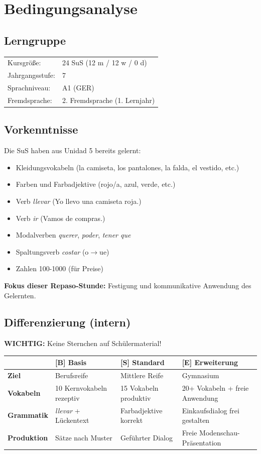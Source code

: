 \documentclass[11pt,a4paper]{article}
\newcommand{\jahrgangsstufe}{7}
\newcommand{\lerngruppengroesse}{24}
\newcommand{\maennlich}{12}
\newcommand{\weiblich}{12}
\newcommand{\divers}{0}
\newcommand{\gerniveau}{A1}
\begin{document}
\section{Bedingungsanalyse}

\subsection{Lerngruppe}
\begin{tabular}{ll}
    Kursgröße: & \lerngruppengroesse{} SuS (\maennlich{} m / \weiblich{} w / \divers{} d) \\
    Jahrgangsstufe: & \jahrgangsstufe \\
    Sprachniveau: & \gerniveau{} (GER) \\
    Fremdsprache: & 2. Fremdsprache (1. Lernjahr) \\
\end{tabular}

\subsection{Vorkenntnisse}
Die SuS haben aus Unidad 5 bereits gelernt:
\begin{itemize}
    \item Kleidungsvokabeln (la camiseta, los pantalones, la falda, el vestido, etc.)
    \item Farben und Farbadjektive (rojo/a, azul, verde, etc.)
    \item Verb \textit{llevar} (Yo llevo una camiseta roja.)
    \item Verb \textit{ir} (Vamos de compras.)
    \item Modalverben \textit{querer}, \textit{poder}, \textit{tener que}
    \item Spaltungsverb \textit{costar} (o$\rightarrow$ue)
    \item Zahlen 100-1000 (für Preise)
\end{itemize}

\textbf{Fokus dieser Repaso-Stunde:} Festigung und kommunikative Anwendung des Gelernten.

\subsection{Differenzierung (intern)}

\textbf{WICHTIG:} Keine Sternchen auf Schülermaterial!

\begin{tabular}{|l|p{4cm}|p{4cm}|p{4cm}|}
\hline
& \textbf{[B] Basis} & \textbf{[S] Standard} & \textbf{[E] Erweiterung} \\
\hline
\textbf{Ziel} & Berufsreife & Mittlere Reife & Gymnasium \\
\hline
\textbf{Vokabeln} & 10 Kernvokabeln rezeptiv & 15 Vokabeln produktiv & 20+ Vokabeln + freie Anwendung \\
\hline
\textbf{Grammatik} & \textit{llevar} + Lückentext & Farbadjektive korrekt & Einkaufsdialog frei gestalten \\
\hline
\textbf{Produktion} & Sätze nach Muster & Geführter Dialog & Freie Modenschau-Präsentation \\
\hline
\end{tabular}
\end{document}
